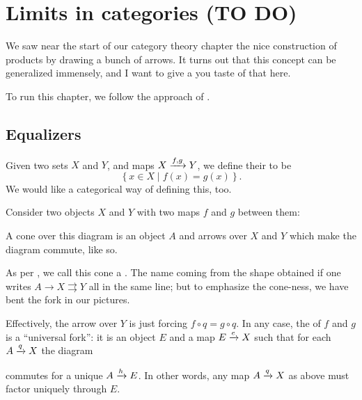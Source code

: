 \chapter{Limits in categories (TO DO)}
\label{ch:category_limits}
We saw near the start of our category theory chapter
the nice construction of products by drawing
a bunch of arrows.
It turns out that this concept can be generalized immensely,
and I want to give a you taste of that here.

To run this chapter, we follow the approach of \cite{ref:msci}.

\section{Equalizers}
Given two sets $X$ and $Y$, and maps $X \xrightarrow{f,g} Y$, we define their  to be
\[ \left\{ x \in X \mid f(x) = g(x) \right\}. \]
We would like a categorical way of defining this, too.

Consider two objects $X$ and $Y$ with two maps $f$ and $g$ between them:
\begin{center}
\end{center}
A cone over this diagram is an object $A$ and arrows over $X$ and $Y$
which make the diagram commute, like so.
\begin{center}
\end{center}
As per \cite{ref:msci}, we call this cone a .
The name coming from the shape obtained if one writes $A \to X \rightrightarrows Y$
all in the same line; but to emphasize the cone-ness, we have bent the fork in our pictures.

Effectively, the arrow over $Y$ is just forcing $f \circ q = g \circ q$.
In any case, the  of $f$ and $g$ is a ``universal fork'':
it is an object $E$ and a map $E \xrightarrow{e} X$ such that
for each $A \xrightarrow{q} X$ the diagram
\begin{center}
\end{center}
commutes for a unique $A \xrightarrow{h} E$.
In other words, any map $A \xrightarrow{q} X$ as above
must factor uniquely through $E$.

